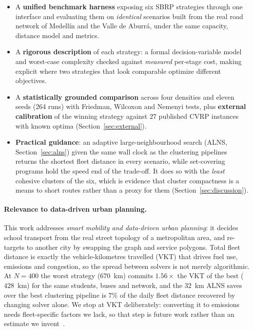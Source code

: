\documentclass[graybox]{SNmult}
\begin{document}
\begin{itemize}
\item A \textbf{unified benchmark harness} exposing six SBRP strategies
through one interface and evaluating them on \emph{identical} scenarios
built from the real road network of Medell\'in and the Valle de Aburr\'a,
under the same capacity, distance model and metrics.
\item A \textbf{rigorous description} of each strategy: a formal
decision-variable model and worst-case complexity checked against
\emph{measured} per-stage cost, making explicit where two strategies that
look comparable optimize different objectives.
\item A \textbf{statistically grounded comparison} across four densities
and eleven seeds (264 runs) with Friedman, Wilcoxon and Nemenyi tests,
plus \textbf{external calibration} of the winning strategy against $27$
published CVRP instances with known optima (Section~\ref{sec:external}).
\item \textbf{Practical guidance}: an adaptive large-neighbourhood search
(ALNS, Section~\ref{sec:alns}) given the same wall clock as the clustering
pipelines returns the shortest fleet distance in every scenario, while
set-covering programs hold the speed end of the trade-off. It does so with
the \emph{least} cohesive clusters of the six, which is evidence that
cluster compactness is a means to short routes rather than a proxy for
them (Section~\ref{sec:discussion}).
\end{itemize}

\paragraph{Relevance to data-driven urban planning.}
This work addresses \emph{smart mobility and data-driven urban planning}:
it decides school transport from the real street topology of a
metropolitan area, and re-targets to another city by swapping the graph
and service polygons. Total fleet distance is exactly the
vehicle-kilometres travelled (VKT) that drives fuel use, emissions and
congestion, so the spread between solvers is not merely algorithmic. At
$N=400$ the worst strategy ($670$~km) commits $1.56\times$ the VKT of the
best ($428$~km) for the same students, buses and network, and the $32$~km
ALNS saves over the best clustering pipeline is $7\%$ of the daily fleet
distance recovered by changing solver alone. We stop at VKT deliberately:
converting it to emissions needs fleet-specific factors we lack, so that
step is future work rather than an estimate we
invent~\cite{Sabet2022GreenVRP}.
\end{document}
